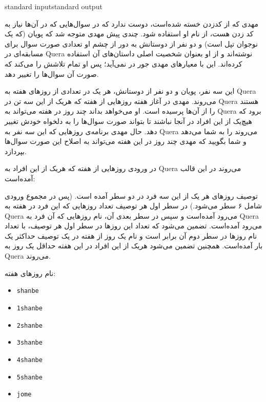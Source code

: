 \begin{problem}{}
{standard input}{standard output}
{}{}{}

    مهدی که از کدزدن خسته شده‌است، دوست ندارد که در سوال‌هایی که در آن‌ها نیاز به کد زدن هست، از نام او استفاده شود. چندی پیش مهدی متوجه شد که پویان (که یک نوجوان تپل است) و دو نفر از دوستانش به دور از چشم او تعدادی صورت سوال برای مسابقه‌ای در Quera نوشته‌اند و از او بعنوان شخصیت اصلی داستان‌های آن استفاده کرده‌اند. این با معیارهای مهدی جور در نمی‌آید؛ پس او تمام تلاشش را می‌کند که صورت آن سوال‌ها را تغییر دهد.

    این سه نفر، پویان و دو نفر از دوستانش، هر یک در تعدادی از روزهای هفته به Quera می‌روند. مهدی در آغاز هفته روزهایی از هفته که هریک از این سه تن در Quera هستند را از آن‌ها پرسیده است. او می‌خواهد بداند چند روز در هفته می‌تواند به Quera برود که هیچ‌یک از این افراد در آنجا نباشند تا بتواند صورت سوال‌ها را به دلخواه خودش تغییر دهد. حال مهدی برنامه‌ی روزهایی که این سه نفر به Quera می‌روند را به شما می‌دهد و شما بگویید که مهدی چند روز در این هفته می‌تواند به اصلاح این صورت سوال‌ها بپردازد.

    \Explanations
    در ورودی روز‌هایی از هفته که هریک از این افراد به Quera می‌روند در این قالب آمده‌است:

    توصیف روز‌های هر یک از این سه فرد در دو سطر آمده است. (پس در مجموع ورودی شامل ۶ سطر می‌شود.) در سطر اول هر توصیف تعداد روز‌هایی که این فرد در هفته به Quera می‌رود آمده‌است و سپس در سطر بعدی آن، نام روز‌هایی که آن فرد به Quera می‌رود آمده‌است. تضمین می‌شود که تعداد این روز‌ها در سطر اول هر توصیف، با تعداد نام روزها در سطر دوم آن برابر است و نام یک روز از هفته در یک توصیف حداکثر یک‌ بار آمده‌است. همچنین تضمین می‌شود هریک از این افراد در این هفته حداقل یک روز به Quera می‌روند.

    نام روز‌های هفته:
    \begin{itemize}
        \item \texttt{shanbe}
        \item \texttt{1shanbe}
        \item \texttt{2shanbe}
        \item \texttt{3shanbe}
        \item \texttt{4shanbe}
        \item \texttt{5shanbe}
        \item \texttt{jome}
    \end{itemize}


\end{problem}
